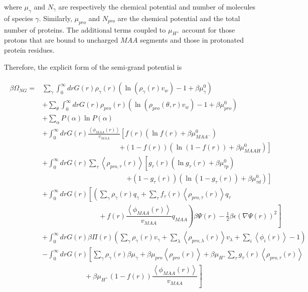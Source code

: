 \documentclass[journal=jacsat,manuscript=suppinfo]{achemso}
\begin{document}
\noindent where  $\mu_\gamma$ and $N_\gamma$ are respectively the chemical potential and  number of molecules of species $\gamma$.
Similarly, $\mu_{pro}$ and $N_{pro}$ are the chemical potential and the total number of proteins.
The additional terms coupled to $\mu_{H^+}$
account for those protons that are bound to uncharged $MAA$ segments and those in protonated protein residues.




Therefore, the explicit form of the semi-grand potential is

\begin{align}
	\begin{aligned}
		\beta\Omega_{NG}=&  \sum_{\gamma}\int_0^\infty{dr G(r)\rho_\gamma(r)\left(\ln \left(\rho_\gamma (r)v_w\right) -1 + \beta\mu^0_\gamma\right)} \\
		& +\sum_\theta \int_0^\infty{dr G(r)\rho_{pro}(r)\left(\ln (\rho_{pro}(\theta,r)v_w)-1 + \beta\mu^0_{pro} \right)} \\
		& + \sum_{\alpha}{P(\alpha)\ln P(\alpha)} \\
		& +\int_0^\infty drG(r) \frac{\left<\phi_{MAA}(r)\right>}{v_{MAA}} \left[f(r)(\ln f(r)+ \beta\mu^0_{MAA^-})\right.\\
		&\qquad \qquad \qquad\qquad \qquad \quad \left.+(1-f(r))(\ln (1-f(r))+\beta\mu^0_{MAAH})\right] \\
		& +\int_0^\infty drG(r)\sum_\tau \left<\rho_{pro,\tau}(r)\right> \left[g_\tau(r)(\ln g_\tau(r)+ \beta\mu^0_{\tau p})\right.\\
		&\qquad\qquad \qquad\qquad \qquad \qquad\left.+(1-g_\tau(r))(\ln (1-g_\tau(r))+\beta\mu^0_{\tau d})\right] \\
		& +  \int_0^\infty drG(r)\left[\left(\sum_{\gamma } \rho_\gamma(r) q_\gamma + \sum_\tau{f_\tau(r) \left<\rho_{pro,\tau}(r)\right> q_\tau} \right. \right. \\ 
		& \left. \left. \hspace{8em}+  f(r)\dfrac{\left<\phi_{MAA}(r)\right>}{v_{MAA}}q_{MAA}\right)\beta\Psi(r)  -\frac{1}{2}\beta\epsilon(\nabla\Psi(r))^2 \right]\\
		&+ \int_0^\infty drG(r)  \beta\Pi(r){\left(\sum_{\gamma}\rho_\gamma(r) v_\gamma + \sum_{\lambda}{\left<\rho_{pro,\lambda}(r)\right>}{v_\lambda} + \sum_i\left<\phi_i(r)\right> -1\right)}\\
		& -\int_0^\infty drG(r)\left[\sum_{\gamma }{\rho_\gamma(r)\beta\mu_\gamma}
		+ \beta\mu_{pro} \left<\rho_{pro}(r)\right>
		+\beta\mu_{H^+}\sum_{\tau}{g_\tau(r)\left<\rho_{pro,\tau}(r)\right> } \right.\\
		& \left. \hspace{6em} +\beta\mu_{H^+}(1-f(r))\dfrac{\left<\phi_{MAA}(r)\right>}{v_{MAA}}\right]%
	\end{aligned}
	\label{eq:si:free-energy_expl}
\end{align}
\end{document}
